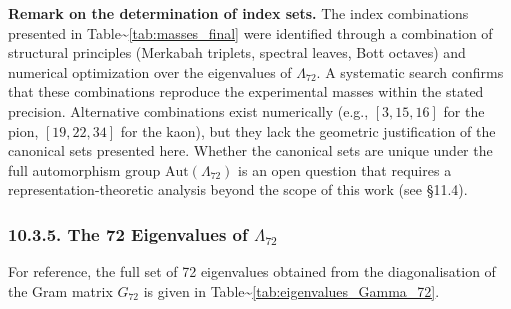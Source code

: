 \documentclass[11pt]{article}
\begin{document}
\textbf{Remark on the determination of index sets.} The index
combinations presented in Table\textasciitilde{}\ref{tab:masses_final}
were identified through a combination of structural principles (Merkabah
triplets, spectral leaves, Bott octaves) and numerical optimization over
the eigenvalues of \(\Lambda_{72}\). A systematic search confirms that
these combinations reproduce the experimental masses within the stated
precision. Alternative combinations exist numerically (e.g.,
\([3,15,16]\) for the pion, \([19,22,34]\) for the kaon), but they lack
the geometric justification of the canonical sets presented here.
Whether the canonical sets are unique under the full automorphism group
\(\mathrm{Aut}(\Lambda_{72})\) is an open question that requires a
representation-theoretic analysis beyond the scope of this work (see
§11.4).

\hypertarget{the-72-eigenvalues-of-lambda_72}{%
\subsubsection{\texorpdfstring{10.3.5. The 72 Eigenvalues of
\(\Lambda_{72}\)}{10.3.5. The 72 Eigenvalues of \textbackslash Lambda\_\{72\}}}\label{the-72-eigenvalues-of-lambda_72}}

For reference, the full set of 72 eigenvalues obtained from the
diagonalisation of the Gram matrix \(G_{72}\) is given in
Table\textasciitilde{}\ref{tab:eigenvalues_Gamma_72}.
\end{document}
